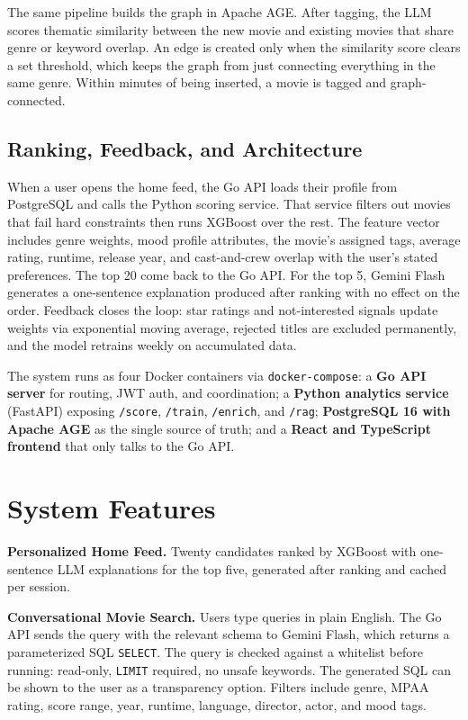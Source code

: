 \documentclass[conference]{IEEEtran}
\begin{document}
The same pipeline builds the graph in Apache AGE. After tagging, the LLM scores thematic similarity between the new movie and existing movies that share genre or keyword overlap. An edge is created only when the similarity score clears a set threshold, which keeps the graph from just connecting everything in the same genre. Within minutes of being inserted, a movie is tagged and graph-connected.

\subsection{Ranking, Feedback, and Architecture}

When a user opens the home feed, the Go API loads their profile from PostgreSQL and calls the Python scoring service. That service filters out movies that fail hard constraints then runs XGBoost over the rest. The feature vector includes genre weights, mood profile attributes, the movie's assigned tags, average rating, runtime, release year, and cast-and-crew overlap with the user's stated preferences. The top 20 come back to the Go API. For the top 5, Gemini Flash generates a one-sentence explanation produced after ranking with no effect on the order. Feedback closes the loop: star ratings and not-interested signals update weights via exponential moving average, rejected titles are excluded permanently, and the model retrains weekly on accumulated data.

The system runs as four Docker containers via \texttt{docker-compose}: a \textbf{Go API server} for routing, JWT auth, and coordination; a \textbf{Python analytics service} (FastAPI) exposing \texttt{/score}, \texttt{/train}, \texttt{/enrich}, and \texttt{/rag}; \textbf{PostgreSQL 16 with Apache AGE} as the single source of truth; and a \textbf{React and TypeScript frontend} that only talks to the Go API.

\section{System Features}

\textbf{Personalized Home Feed.} Twenty candidates ranked by XGBoost with one-sentence LLM explanations for the top five, generated after ranking and cached per session.

\textbf{Conversational Movie Search.} Users type queries in plain English. The Go API sends the query with the relevant schema to Gemini Flash, which returns a parameterized SQL \texttt{SELECT}. The query is checked against a whitelist before running: read-only, \texttt{LIMIT} required, no unsafe keywords. The generated SQL can be shown to the user as a transparency option. Filters include genre, MPAA rating, score range, year, runtime, language, director, actor, and mood tags.
\end{document}
